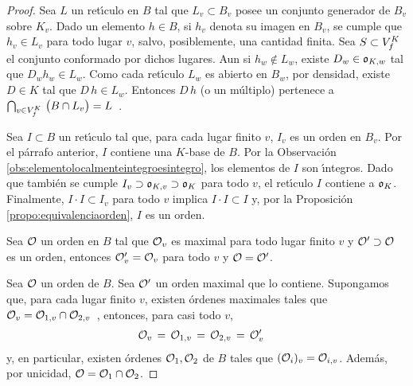 \begin{proof}
	Sea $L$ un ret\'{\i}culo en $B$ tal que $L_{v}\subset B_{v}$ posee un
	conjunto generador de $B_{v}$ sobre $K_{v}$. Dado un elemento $h\in B$,
	si $h_{v}$ denota su imagen en $B_{v}$, se cumple que $h_{v}\in L_{v}$
	para todo lugar $v$, salvo, posiblemente, una cantidad finita. Sea
	$S\subset\lugares[f]{K}$ el conjunto conformado por dichos lugares. Aun
	si $h_{w}\not\in L_{w}$, existe $D_{w}\in\oka{K,w}$ tal que
	$D_{w}h_{w}\in L_{w}$. Como cada ret\'{\i}culo $L_{w}$ es abierto en
	$B_{w}$,
	por densidad, existe $D\in K$ tal que
	$D\,h\in L_{w}$. Entonces $D\,h$ (o un m\'{u}ltiplo) pertenece a
	\begin{math}
		\bigcap_{v\in\lugares[f]{K}}\,\big(B\cap L_{v}\big)=L
	\end{math}~.

	Sea $I\subset B$ un ret\'{\i}culo tal que, para cada lugar finito $v$,
	$I_{v}$ es un orden en $B_{v}$. Por el p\'{a}rrafo anterior, $I$
	contiene una $K$-base de $B$. Por la Observaci\'{o}n
	\ref{obs:elementolocalmenteintegroesintegro}, los elementos de $I$ son
	\'{\i}ntegros. Dado que tambi\'{e}n se cumple
	$I_{v}\supset\oka{K,v}\supset\oka{K}$ para todo $v$, el ret\'{\i}culo
	$I$ contiene a $\oka{K}$. Finalmente, $I\cdot I\subset I_{v}$ para todo
	$v$ implica $I\cdot I\subset I$ y, por la Proposici\'{o}n
	\ref{propo:equivalenciaorden}, $I$ es un orden.

	Sea $\cal{O}$ un orden en $B$ tal que $\cal{O}_{v}$ es maximal para
	todo lugar finito $v$ y $\cal{O}'\supset\cal{O}$ es un orden, entonces
	$\cal{O}_{v}'=\cal{O}_{v}$ para todo $v$ y $\cal{O}=\cal{O}'$.

	Sea $\cal{O}$ un orden de $B$. Sea $\cal{O}'$ un orden maximal que lo
	contiene. Supongamos que, para cada lugar finito $v$, existen
	\'{o}rdenes maximales tales que
	\begin{math}
		\cal{O}_{v}=\cal{O}_{1,v}\cap\cal{O}_{2,v}
	\end{math}~,
	entonces, para casi todo $v$,
	\begin{align*}
		\cal{O}_{v} & \,=\,
			\cal{O}_{1,v}\,=\,\cal{O}_{2,v}\,=\,\cal{O}_{v}'
	\end{align*}
	y, en particular, existen \'{o}rdenes $\cal{O}_{1},\cal{O}_{2}$ de $B$
	tales que $(\cal{O}_{i})_{v}=\cal{O}_{i,v}$. Adem\'{a}s, por unicidad,
	$\cal{O}=\cal{O}_{1}\cap\cal{O}_{2}$.
\end{proof}

